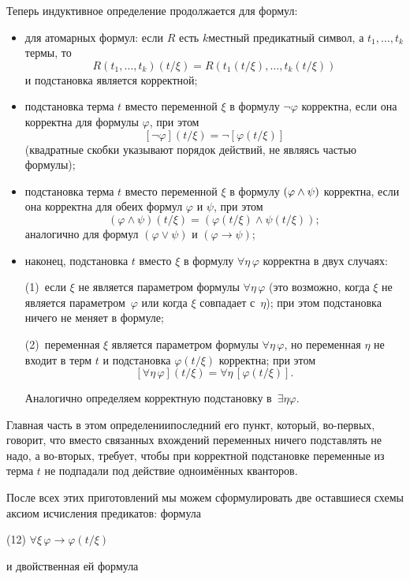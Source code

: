 Теперь индуктивное определение продолжается для формул:
\begin{itemize}
        \item
для атомарных формул:
если $R$ есть $k$\д местный предикатный символ, а
$t_1,\dots,t_k$\т термы, то
        $$
R(t_1,\dots,t_k)(t/\xi)=R(t_1(t/\xi),\dots,t_k(t/\xi))
        $$
и подстановка является корректной;
        \item
подстановка терма $t$ вместо переменной $\xi$ в формулу $\lnot
\varphi$ корректна, если она корректна для формулы $\varphi$,
при этом
        $$
 [\lnot \varphi] (t/\xi) = \lnot [\varphi(t/\xi)]
        $$
(квадратные скобки указывают порядок действий, не являясь
частью формулы);
        \item
подстановка терма $t$ вместо переменной $\xi$ в формулу
$(\varphi\hm\land\psi)$ корректна, если она корректна для обеих
формул $\varphi$ и $\psi$, при этом
        $$
 (\varphi \land \psi) (t/\xi) = (\varphi(t/\xi)\land\psi(t/\xi));
        $$
аналогично для формул $(\varphi\lor\psi)$ и $(\varphi\to\psi)$;
        \item
наконец, подстановка $t$ вместо $\xi$ в формулу $\forall
\eta\,\varphi$ корректна в двух случаях:

(1)~если $\xi$ не является параметром формулы $\forall
\eta\,\varphi$ (это возможно, когда $\xi$ не является
параметром~$\varphi$ или когда $\xi$ совпадает с~$\eta$); при
этом подстановка ничего не меняет в формуле;

(2)~переменная $\xi$ является параметром формулы
$\forall\eta\,\varphi$, но переменная $\eta$ не входит в терм
$t$ и подстановка $\varphi(t/\xi)$ корректна; при этом
        $$
[\forall \eta \, \varphi] (t/\xi) = \forall \eta\,[\varphi (t/\xi)].
        $$

Аналогично определяем корректную подстановку в~$\exists\eta\varphi$.
\end{itemize}

Главная часть в этом определении\т последний его пункт, который,
во-первых, говорит, что вместо связанных вхождений переменных
ничего подставлять не надо, а во-вторых, требует, чтобы при корректной
подстановке переменные из терма $t$ не подпадали под действие
одноимённых кванторов.

После всех этих приготовлений мы можем сформулировать две
оставшиеся схемы аксиом исчисления предикатов: формула

(12) $\forall \xi \,\varphi \to \varphi(t/\xi)$

\noindent
и двойственная ей формула

